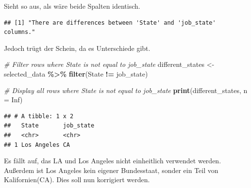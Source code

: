\documentclass[
]{article}
\newenvironment{Shaded}{\begin{snugshade}}{\end{snugshade}}
\newcommand{\AttributeTok}[1]{\textcolor[rgb]{0.13,0.29,0.53}{#1}}
\newcommand{\CommentTok}[1]{\textcolor[rgb]{0.56,0.35,0.01}{\textit{#1}}}
\newcommand{\ConstantTok}[1]{\textcolor[rgb]{0.56,0.35,0.01}{#1}}
\newcommand{\ControlFlowTok}[1]{\textcolor[rgb]{0.13,0.29,0.53}{\textbf{#1}}}
\newcommand{\FunctionTok}[1]{\textcolor[rgb]{0.13,0.29,0.53}{\textbf{#1}}}
\newcommand{\NormalTok}[1]{#1}
\newcommand{\OtherTok}[1]{\textcolor[rgb]{0.56,0.35,0.01}{#1}}
\newcommand{\SpecialCharTok}[1]{\textcolor[rgb]{0.81,0.36,0.00}{\textbf{#1}}}
\newcommand{\StringTok}[1]{\textcolor[rgb]{0.31,0.60,0.02}{#1}}
\begin{document}
Sieht so aus, als wäre beide Spalten identisch.

\begin{Shaded}
\end{Shaded}

\begin{verbatim}
## [1] "There are differences between 'State' and 'job_state' columns."
\end{verbatim}

Jedoch trügt der Schein, da es Unterschiede gibt.

\begin{Shaded}
\begin{Highlighting}[]
\CommentTok{\# Filter rows where State is not equal to job\_state}
\NormalTok{different\_states }\OtherTok{\textless{}{-}}\NormalTok{ selected\_data }\SpecialCharTok{\%\textgreater{}\%}
  \FunctionTok{filter}\NormalTok{(State }\SpecialCharTok{!=}\NormalTok{ job\_state)}

\CommentTok{\# Display all rows where State is not equal to job\_state}
\FunctionTok{print}\NormalTok{(different\_states, }\AttributeTok{n =} \ConstantTok{Inf}\NormalTok{)}
\end{Highlighting}
\end{Shaded}

\begin{verbatim}
## # A tibble: 1 x 2
##   State       job_state
##   <chr>       <chr>    
## 1 Los Angeles CA
\end{verbatim}

Es fällt auf, das LA und Los Angeles nicht einheitlich verwendet werden.
Außerdem ist Los Angeles kein eigener Bundesstaat, sonder ein Teil von
Kalifornien(CA). Dies soll nun korrigiert werden.
\end{document}
